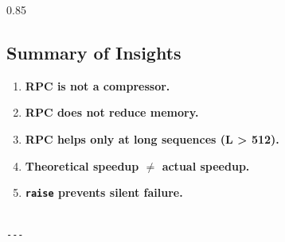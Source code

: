 0.85

\subsection{Summary of Insights}

\begin{enumerate}
\item \textbf{RPC is not a compressor.}
\item \textbf{RPC does not reduce memory.}
\item \textbf{RPC helps only at long sequences (L > 512).}
\item \textbf{Theoretical speedup $\ne$ actual speedup.}
\item \textbf{\texttt{raise} prevents silent failure.}
\end{enumerate}
\begin{lstlisting}

---
\end{lstlisting}